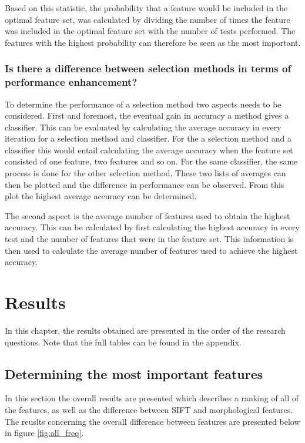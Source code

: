 \documentclass{kththesis}
\begin{document}
Based on this statistic, the probability that a feature would be included in the optimal feature set, was calculated by dividing the number of times the feature was included in the optimal feature set with the number of tests performed. The features with the highest probability can therefore be seen as the most important.


\subsection{Is there a difference between selection methods in terms of performance enhancement?}

To determine the performance of a selection method two aspects needs to be considered. First and foremost, the eventual gain in accuracy a method gives a classifier. This can be evaluated by calculating the average accuracy in every iteration for a selection method and classifier. For the a selection method and a classifier this would entail calculating the average accuracy when the feature set consisted of one feature, two features and so on. For the same classifier, the same process is done for the other selection method. These two lists of averages can then be plotted and the difference in performance can be observed. From this plot the highest average accuracy can be determined. 


The second aspect is the average number of features used to obtain the highest accuracy. This can be calculated by first calculating the highest accuracy in every test and the number of features that were in the feature set. This information is then used to calculate the average number of features used to achieve the highest accuracy. 


\chapter{Results}

In this chapter, the results obtained are presented in the order of the research questions. Note that the full tables can be found in the appendix.


\section{Determining the most important features}

In this section the overall results are presented which describes a ranking of all of the features, as well as the difference between SIFT and morphological features. The reuslts concerning the overall difference between features are presented below in figure \ref{fig:all_freq}.
\end{document}
